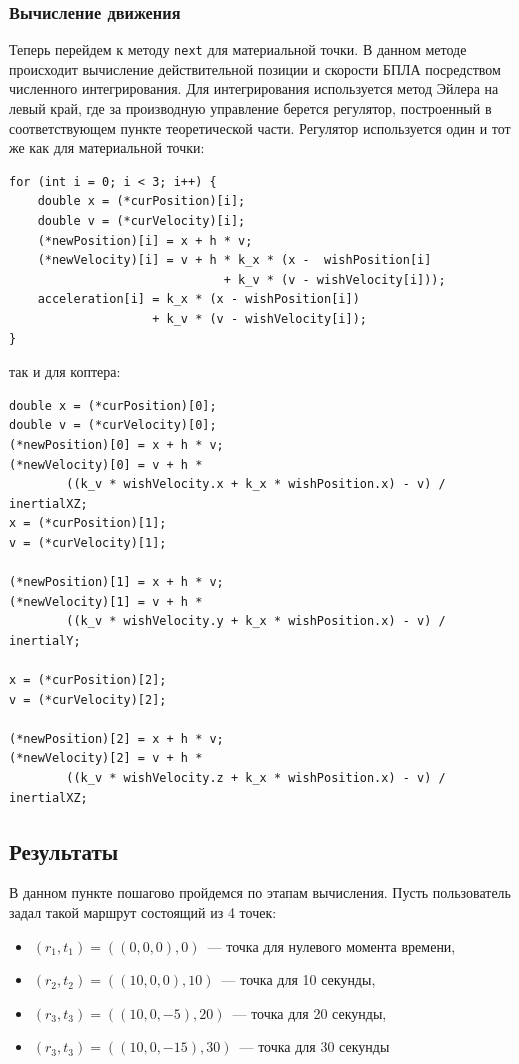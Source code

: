 \documentclass[a4paper,12pt]{article}
\begin{document}
\subsubsection{Вычисление движения}
Теперь перейдем к методу \texttt{next} для материальной точки. В данном методе происходит вычисление действительной позиции и скорости БПЛА посредством численного интегрирования. Для интегрирования используется метод Эйлера на левый край, где за производную управление берется регулятор, построенный в соответствующем пункте теоретической части. Регулятор используется один и тот же как для материальной точки:
\begin{verbatim}
for (int i = 0; i < 3; i++) {
    double x = (*curPosition)[i];
    double v = (*curVelocity)[i];
    (*newPosition)[i] = x + h * v;
    (*newVelocity)[i] = v + h * k_x * (x -  wishPosition[i] 
                              + k_v * (v - wishVelocity[i]));
    acceleration[i] = k_x * (x - wishPosition[i]) 
                    + k_v * (v - wishVelocity[i]);
}
\end{verbatim}
так и для коптера:
\begin{verbatim}
double x = (*curPosition)[0];
double v = (*curVelocity)[0];
(*newPosition)[0] = x + h * v;
(*newVelocity)[0] = v + h * 
        ((k_v * wishVelocity.x + k_x * wishPosition.x) - v) / inertialXZ;
x = (*curPosition)[1];
v = (*curVelocity)[1];

(*newPosition)[1] = x + h * v;
(*newVelocity)[1] = v + h * 
        ((k_v * wishVelocity.y + k_x * wishPosition.x) - v) / inertialY;

x = (*curPosition)[2];
v = (*curVelocity)[2];

(*newPosition)[2] = x + h * v;
(*newVelocity)[2] = v + h * 
        ((k_v * wishVelocity.z + k_x * wishPosition.x) - v) / inertialXZ;
\end{verbatim}
\subsection{Результаты}

В данном пункте пошагово пройдемся по этапам вычисления. Пусть пользователь задал такой маршрут состоящий из 4 точек: 
\begin{itemize}
    \item $(r_1,t_1) = ((0,0,0),0)$~--- точка для нулевого момента времени,
    \item $(r_2,t_2) = ((10,0,0),10)$~--- точка для 10 секунды,
    \item $(r_3,t_3) = ((10,0,-5),20)$~--- точка для 20 секунды,
    \item $(r_3,t_3) = ((10,0,-15),30)$~--- точка для 30 секунды
\end{itemize}
\end{document}

